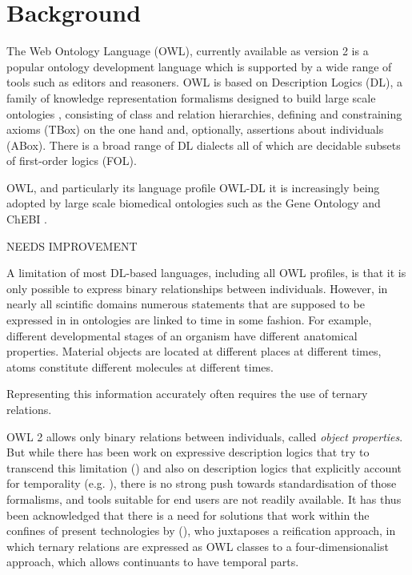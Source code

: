 \documentclass[10pt]{bmc_article}
\newenvironment{bmcformat}{\baselineskip20pt\sloppy\setboolean{publ}{false}}{\baselineskip20pt\sloppy}
\begin{document}
\begin{bmcformat}
\section*{Background}


The Web Ontology Language (OWL), currently available as version 2 \cite{grau2008} is a popular ontology 
development language which is supported by a wide range of tools 
such as editors and reasoners. OWL is based on Description Logics (DL), a family of 
knowledge representation formalisms designed to build
large scale ontologies
\cite{baader2007dlhandbook}, consisting of class and relation hierarchies, defining and 
constraining axioms (TBox) on the one hand and, optionally, assertions about 
individuals (ABox). There is a broad range of DL dialects all of which are 
decidable subsets of first-order logics (FOL). 

OWL, and particularly its language profile OWL-DL it is increasingly being adopted by large scale biomedical
ontologies such as the Gene Ontology \cite{go2000} and ChEBI \cite{chebinar2013}. 

NEEDS IMPROVEMENT

A limitation of most DL-based languages, including all OWL profiles, is that it is only possible to 
express binary relationships between individuals. However, in 
nearly all scintific domains
numerous statements that are supposed to be expressed in 
in ontologies are linked to time in some fashion. 
For example, different developmental stages of an organism have different anatomical properties. 
Material objects are located at different places at different times, 
atoms constitute different molecules at different times. 

Representing this information accurately often requires the use of ternary relations.  


OWL 2 allows only binary relations between individuals, called
\emph{object properties}. But while there has been work on expressive description
logics that try to transcend this limitation (\cite{Calvanese:1997}) and also on description logics
that explicitly account for temporality (e.g. \cite{Wolter:2001}), there is no strong push
towards standardisation of those formalisms, and tools suitable for end users
are not readily available. It has thus been acknowledged that there is a need
for solutions that work within the confines of present technologies
by (\cite{Welty:2006}), who juxtaposes a reification approach, in which ternary relations are 
expressed as OWL classes to a four-dimensionalist approach, which allows continuants to have 
temporal parts.


\end{bmcformat}
\end{document}
